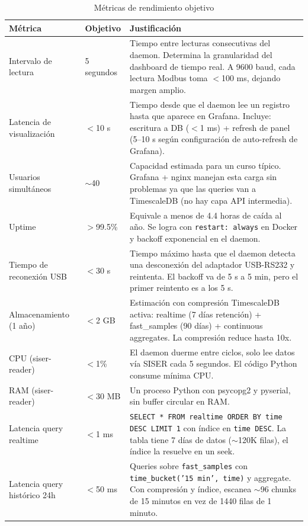 \documentclass[12pt,a4paper]{article}
\begin{document}
\begin{table}[H]
\centering
\begin{tabular}{llp{6cm}}
\toprule
\textbf{M\'etrica} & \textbf{Objetivo} & \textbf{Justificaci\'on} \\
\midrule
Intervalo de lectura & 5 segundos & Tiempo entre lecturas consecutivas del daemon. Determina la granularidad del dashboard de tiempo real. A 9600 baud, cada lectura Modbus toma $<$100 ms, dejando margen amplio. \\
Latencia de visualizaci\'on & $<$10 s & Tiempo desde que el daemon lee un registro hasta que aparece en Grafana. Incluye: escritura a DB ($<$1 ms) + refresh de panel (5--10 s seg\'un configuraci\'on de auto-refresh de Grafana). \\
Usuarios simult\'aneos & $\sim$40 & Capacidad estimada para un curso t\'ipico. Grafana + nginx manejan esta carga sin problemas ya que las queries van a TimescaleDB (no hay capa API intermedia). \\
Uptime & $>$99.5\% & Equivale a menos de 4.4 horas de ca\'ida al a\~no. Se logra con \texttt{restart: always} en Docker y backoff exponencial en el daemon. \\
Tiempo de reconexi\'on USB & $<$30 s & Tiempo m\'aximo hasta que el daemon detecta una desconexi\'on del adaptador USB-RS232 y reintenta. El backoff va de 5 s a 5 min, pero el primer reintento es a los 5 s. \\
Almacenamiento (1 a\~no) & $<$2 GB & Estimaci\'on con compresi\'on TimescaleDB activa: realtime (7 d\'ias retenci\'on) + fast\_samples (90 d\'ias) + continuous aggregates. La compresi\'on reduce hasta 10x. \\
CPU (siser-reader) & $<$1\% & El daemon duerme entre ciclos, solo lee datos v\'ia SISER cada 5 segundos. El c\'odigo Python consume m\'inima CPU. \\
RAM (siser-reader) & $<$30 MB & Un proceso Python con psycopg2 y pyserial, sin buffer circular en RAM. \\
Latencia query realtime & $<$1 ms & \texttt{SELECT * FROM realtime ORDER BY time DESC LIMIT 1} con \'indice en \texttt{time DESC}. La tabla tiene 7 d\'ias de datos ($\sim$120K filas), el \'indice la resuelve en un seek. \\
Latencia query hist\'orico 24h & $<$50 ms & Queries sobre \texttt{fast\_samples} con \texttt{time\_bucket('15 min', time)} y aggregate. Con compresi\'on y \'indice, escanea $\sim$96 chunks de 15 minutos en vez de 1440 filas de 1 minuto. \\
\bottomrule
\end{tabular}
\caption{M\'etricas de rendimiento objetivo}
\end{table}
\end{document}
